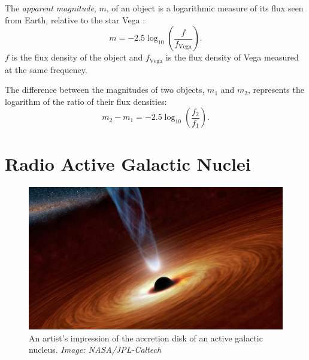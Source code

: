             The \emph{apparent magnitude}, $m$, of an object is a logarithmic
            measure of its flux seen from Earth, relative to the star Vega
            \citep{francis08}:
            \begin{equation}
                \label{eq:apparent-magnitude}
                m = -2.5 \log_{10} \left(\frac{f}{f_{\text{Vega}}}\right).
            \end{equation}
            $f$ is the flux density of the object and $f_{\text{Vega}}$ is the
            flux density of Vega measured at the same frequency.

            The difference between the magnitudes of two objects, $m_1$ and
            $m_2$, represents the logarithm of the ratio of their flux
            densities:
            \begin{equation}
                \label{eq:magnitude-difference}
                m_2 - m_1 = -2.5 \log_{10} \left(\frac{f_2}{f_1}\right).
            \end{equation}

    \section{Radio Active Galactic Nuclei}
    \label{sec:agns}

        \begin{figure}[!ht]
            \centering
            \includegraphics[height=0.2\textheight]
                {images/accretion_disk_artist_impression.jpg}
            \caption{An artist's impression of the accretion disk of an active
                galactic nucleus. \emph{Image: NASA/JPL-Caltech}}
            \label{fig:accretion-disk}
        \end{figure}

